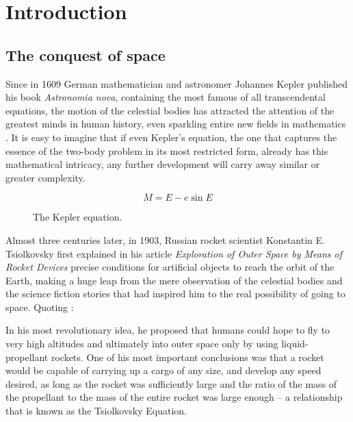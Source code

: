 \chapter{Introduction} \label{sec:introduction}

\section{The conquest of space} \label{sec:conquest}

Since in 1609 German mathematician and astronomer Johannes Kepler published his book \textit{Astronomia nova}, containing the most famous of all transcendental equations, the motion of the celestial bodies has attracted the attention of the greatest minds in human history, even sparkling entire new fields in mathematics \cite{battin1999introduction}. It is easy to imagine that if even Kepler's equation, the one that captures the essence of the two-body problem in its most restricted form, already has this mathematical intricacy, any further development will carry away similar or greater complexity.

\begin{figure}[h]
\[M = E - e \sin{E}\]
\caption{The Kepler equation.}
\end{figure}

Almost three centuries later, in 1903, Russian rocket scientist Konstantin E. Tsiolkovsky first explained in his article \textit{Exploration of Outer Space by Means of Rocket Devices} precise conditions for artificial objects to reach the orbit of the Earth, making a huge leap from the mere observation of the celestial bodies and the science fiction stories that had inspired him to the real possibility of going to space. Quoting \cite{siddiqi2000challenge}:

\begin{displayquote}
In his most revolutionary idea, he proposed that humans could hope to fly to very high altitudes and ultimately into outer space only by using liquid-propellant rockets. One of his most  important conclusions was that a rocket would be capable of carrying up a cargo of any size, and develop any speed desired,  as long as the rocket was sufficiently large and the ratio of the mass of the propellant to the mass of the entire rocket was  large enough -- a relationship that is known as the Tsiolkovsky Equation.
\end{displayquote}

